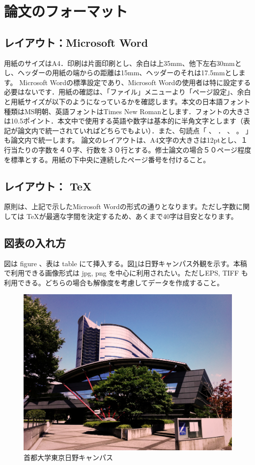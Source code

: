 \documentclass[a4paper]{jsarticle}
\begin{document}
\section{論文のフォーマット}
\subsection{レイアウト：Microsoft Word}
用紙のサイズはA4．印刷は片面印刷とし、余白は上35mm、他下左右30mmとし、ヘッダーの用紙の端からの距離は15mm、ヘッダーのそれは17.5mmとします。
Microsoft Wordの標準設定であり、Microsoft Wordの使用者は特に設定する必要はないです．用紙の確認は、「ファイル」メニューより「ページ設定」、余白と用紙サイズが以下のようになっているかを確認します。本文の日本語フォント種類はMS明朝、英語フォントはTimes New Romanとします．フォントの大きさは10.5ポイント．本文中で使用する英語や数字は基本的に半角文字とします（表記が論文内で統一されていればどちらでもよい）．また、句読点「 、 ． 、 。 」も論文内で統一します。
論文のレイアウトは、A4文字の大きさは12ptとし、１行当たりの字数を４０字、行数を３０行とする。修士論文の場合５０ページ程度を標準とする。用紙の下中央に連続したページ番号を付けること。

\subsection{レイアウト： \TeX}
原則は、上記で示したMicrosoft Wordの形式の通りとなります。ただし字数に関しては \TeX が最適な字間を決定するため、あくまで40字は目安となります。

\subsection{図表の入れ方}
図は figure 、表は table にて挿入する。図\ref{fig:tmu_hino}は日野キャンパス外観を示す。本稿で利用できる画像形式は jpg, png を中心に利用されたい。ただしEPS, TIFF も利用できる。どちらの場合も解像度を考慮してデータを作成すること。
\begin{figure}[tb]
  \begin{center}
    \includegraphics[width=0.95\hsize]{./images/sample.jpg}
    \caption{首都大学東京日野キャンパス}
    \label{fig:tmu_hino}
  \end{center}
\end{figure}
\end{document}
